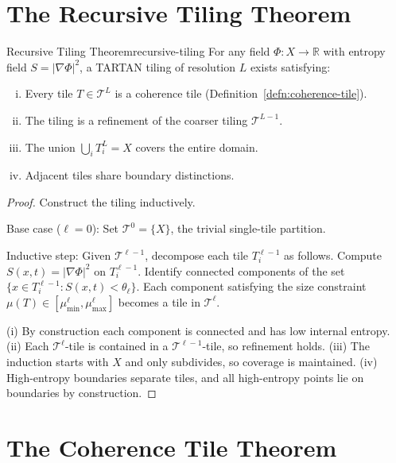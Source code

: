 \documentclass[12pt,twoside,openright]{book}
\begin{document}
\section{The Recursive Tiling Theorem}

\begin{theorem}{Recursive Tiling Theorem}{recursive-tiling}
  For any field $\Phi: X \to \mathbb{R}$ with entropy
  field $S = |\nabla \Phi|^2$, a TARTAN tiling of
  resolution $L$ exists satisfying:
  \begin{enumerate}[(i)]
    \item Every tile $T \in \mathcal{T}^L$ is a coherence
          tile (Definition~\ref{defn:coherence-tile}).
    \item The tiling is a refinement of the coarser
          tiling $\mathcal{T}^{L-1}$.
    \item The union $\bigcup_i T^L_i = X$ covers the
          entire domain.
    \item Adjacent tiles share boundary distinctions.
  \end{enumerate}
\end{theorem}

\begin{proof}
  Construct the tiling inductively.

  Base case ($\ell = 0$): Set $\mathcal{T}^0 = \{X\}$,
  the trivial single-tile partition.

  Inductive step: Given $\mathcal{T}^{\ell-1}$, decompose
  each tile $T^{\ell-1}_i$ as follows.
  Compute $S(x,t) = |\nabla\Phi|^2$ on $T^{\ell-1}_i$.
  Identify connected components of the set
  $\{x \in T^{\ell-1}_i : S(x,t) < \theta_\ell\}$.
  Each component satisfying the size constraint
  $\mu(T) \in [\mu_{\min}^\ell, \mu_{\max}^\ell]$
  becomes a tile in $\mathcal{T}^\ell$.

  (i) By construction each component is connected and
  has low internal entropy.
  (ii) Each $\mathcal{T}^\ell$-tile is contained in a
  $\mathcal{T}^{\ell-1}$-tile, so refinement holds.
  (iii) The induction starts with $X$ and only subdivides,
  so coverage is maintained.
  (iv) High-entropy boundaries separate tiles, and all
  high-entropy points lie on boundaries by construction.
\end{proof}

\section{The Coherence Tile Theorem}
\end{document}
